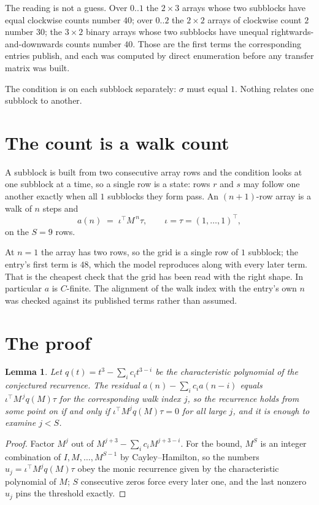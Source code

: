 \documentclass[11pt,a4paper]{article}
\theoremstyle{plain}
\newtheorem{lemma}[theorem]{Lemma}
\theoremstyle{definition}
\begin{document}
The reading is not a guess. Over $0..1$ the $2\times3$ arrays whose two subblocks have equal
clockwise counts number $40$; over $0..2$ the $2\times2$ arrays of clockwise count $2$ number
$30$; the $3\times2$ binary arrays whose two subblocks have unequal rightwards-and-downwards
counts number $40$. Those are the first terms the corresponding entries publish, and each was
computed by direct enumeration before any transfer matrix was built.

The condition is on each subblock separately: $\sigma$ must equal $1$. Nothing
relates one subblock to another.

\section{The count is a walk count}

A subblock is built from two consecutive array rows and the condition looks
at one subblock at a time, so a single row is a state: rows $r$ and $s$ may follow one another
exactly when all $1$ subblocks they form pass. An $(n+1)$-row array is a walk of $n$ steps and
\[
a(n)\;=\;\iota^{\!\top}M^{\,n}\tau,\qquad\iota=\tau=(1,\dots,1)^{\!\top},
\]
on the $S=9$ rows.

At $n=1$ the array has two rows, so the grid is a single row of $1$
subblock; the entry's first term is $48$, which the model
reproduces along with every later term. That is the cheapest check that the grid has been read
with the right shape.
In particular $a$ is $C$-finite. The alignment of the walk index with the entry's own $n$ was
checked against its published terms rather than assumed.

\section{The proof}

\begin{lemma}\label{lem:crit}
Let $q(t)=t^{3}-\sum_i c_it^{3-i}$ be the characteristic polynomial of the
conjectured recurrence. The residual $a(n)-\sum_ic_ia(n-i)$ equals
$\iota^{\!\top}M^{\,j}q(M)\tau$ for the corresponding walk index $j$, so the recurrence
holds from some point on if and only if $\iota^{\!\top}M^{j}q(M)\tau=0$ for all large $j$,
and it is enough to examine $j<S$.
\end{lemma}

\begin{proof}
Factor $M^{j}$ out of $M^{j+3}-\sum_ic_iM^{j+3-i}$. For the bound, $M^{S}$
is an integer combination of $I,M,\dots,M^{S-1}$ by Cayley--Hamilton, so the numbers
$u_j=\iota^{\!\top}M^{j}q(M)\tau$ obey the monic recurrence given by the characteristic
polynomial of $M$; $S$ consecutive zeros force every later one, and the last nonzero $u_j$
pins the threshold exactly.
\end{proof}
\end{document}
